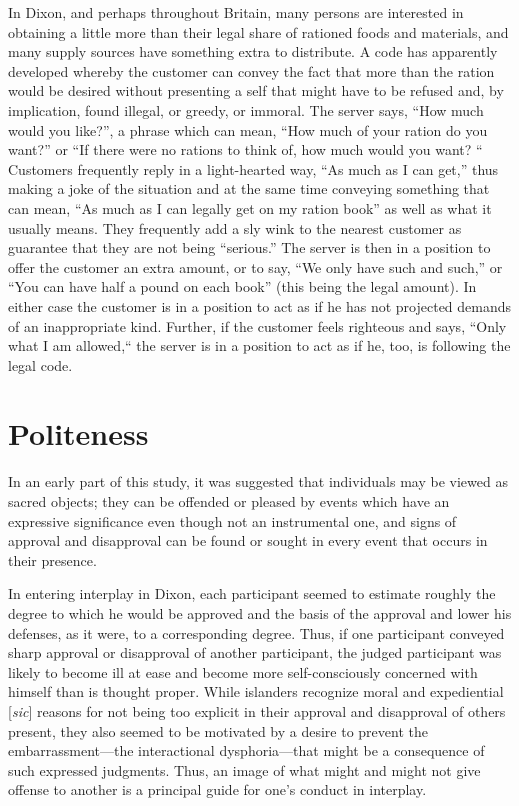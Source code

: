 \documentclass[twoside,symmetric,nobib,justified]{tufte-book}
\begin{document}
In Dixon, and perhaps throughout Britain, many persons are interested in
obtaining a little more than their legal share of rationed foods and
materials, and many supply sources have something extra to distribute. A
code has apparently developed whereby the customer can convey the fact
that more than the ration would be desired without presenting a self
that might have to be refused and, by implication, found illegal, or
greedy, or immoral. The server says, ``How much would you like?'', a
phrase which can mean, ``How much of your ration do you want?'' or ``If
there were no rations to think of, how much would you want? `` Customers
frequently reply in a light-hearted way, ``As much as I can get,'' thus
making a joke of the situation and at the same time conveying something
that can mean, ``As much as I can legally get on my ration book'' as
well as what it usually means. They frequently add a sly wink to the
nearest customer as guarantee that they are not being ``serious.'' The
server is then in a position to offer the customer an extra amount, or
to say, ``We only have such and such,'' or ``You can have half a pound
on each book'' (this being the legal amount). In either case the
customer is in a position to act as if he has not projected demands of
an inappropriate kind. Further, if the customer feels righteous and
says, ``Only what I am allowed,`` the server is in a position to act as
if he, too, is following the legal code.

\hypertarget{politeness}{%
\section{Politeness}\label{politeness}}

In an early part of this study, it was suggested that individuals may be
viewed as sacred objects; they can be offended or pleased by events
which have an expressive significance even though not an instrumental
one, and signs of approval and disapproval can be found or sought in
every event that occurs in their presence.

In entering interplay in Dixon, each participant seemed to estimate
roughly the degree to which he would be approved and the basis of the
approval and lower his defenses, as it were, to a corresponding degree.
Thus, if one participant conveyed sharp approval or disapproval of
another participant, the judged participant was likely to become ill at
ease and become more self-consciously concerned with himself than is
thought proper. While islanders recognize moral and expediential {[}\emph{sic}{]} reasons
for not being too explicit in their approval and disapproval of others
present, they also seemed to be motivated by a desire to prevent the
embarrassment---the interactional dysphoria---that might be a
consequence of such expressed judgments. Thus, an image of what might
and might not give offense to another is a principal guide for one's
conduct in interplay.
\end{document}
